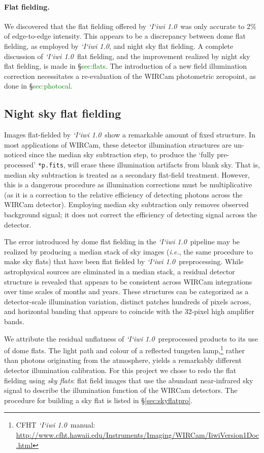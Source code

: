 \documentclass[iop]{emulateapj}
\newcommand{\ie}{\textit{i.e.}}
\newcommand{\sw}[1]{\textit{#1}} %
\newcommand{\iiwione}{\sw{`I`iwi 1.0}}
\newcommand{\todo}[1]{\textcolor{green}{#1}}
\begin{document}
\paragraph{Flat fielding.} We discovered that the flat fielding offered by \iiwione\ was only accurate to 2\% of edge-to-edge intensity. This appears to be a discrepancy between dome flat fielding, as employed by \iiwione, and night sky flat fielding. A complete discussion of \iiwione\ flat fielding, and the improvement realized by night sky flat fielding, is made in \S \todo{sec:flats}. The introduction of a new field illumination correction necessitates a re-evaluation of the WIRCam photometric zeropoint, as done in \S\todo{sec:photocal}.

\subsection{Night sky flat fielding}
\label{sec:flats}

Images flat-fielded by \iiwione\ show a remarkable amount of fixed structure. In most applications of WIRCam, these detector illumination structures are un-noticed since the median sky subtraction step, to produce the `fully pre-processed' \texttt{*p.fits}, will erase these illumination artifacts from blank sky. That is, median sky subtraction is treated as a secondary flat-field treatment. However, this is a dangerous procedure as illumination corrections must be multiplicative (as it is a correction to the relative efficiency of detecting photons across the WIRCam detector). Employing median sky subtraction only removes observed background signal; it does not correct the efficiency of detecting signal across the detector.

The error introduced by dome flat fielding in the \iiwione\ pipeline may be realized by producing a median stack of sky images (\ie, the same procedure to make sky flats) that have been flat fielded by \iiwione\ preprocessing. While astrophysical sources are eliminated in a median stack, a residual detector structure is revealed that appears to be consistent across WIRCam integrations over time scales of months and years. These structures can be categorized as a detector-scale illumination variation, distinct patches hundreds of pixels across, and horizontal banding that appears to coincide with the 32-pixel high amplifier bands.

We attribute the residual unflatness of \iiwione\ preprocessed products to its use of dome flats. The light path and colour of a reflected tungsten lamp,\footnote{CFHT \iiwione\ manual: \url{http://www.cfht.hawaii.edu/Instruments/Imaging/WIRCam/IiwiVersion1Doc.html}} rather than photons originating from the atmosphere, yields a remarkably different detector illumination calibration. For this project we chose to redo the flat fielding using \emph{sky flats}: flat field images that use the abundant near-infrared sky signal to describe the illumination function of the WIRCam detectors. The procedure for building a sky flat is listed in \S\ref{sec:skyflatpro}.
\end{document}
